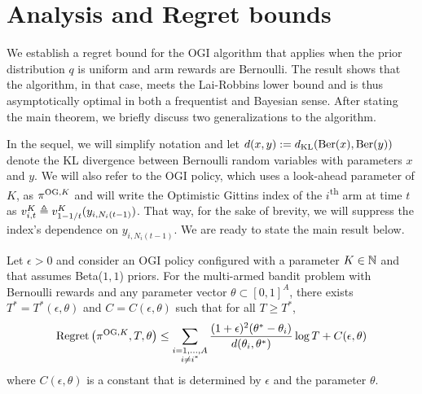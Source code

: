 \section{Analysis and Regret bounds} \label{sec:analysis_of_regret}
We establish a regret bound for the OGI algorithm that applies when the prior distribution $q$ is uniform and arm rewards are Bernoulli. The result shows that the algorithm, in that case, meets the Lai-Robbins lower bound and is thus asymptotically optimal in both a frequentist and Bayesian sense. After stating the main theorem, we briefly discuss two generalizations to the algorithm.

In the sequel, we will simplify notation  and let $d(x,y) := d_{\rm KL}(\text{Ber}(x),\text{Ber}(y))$ denote the KL divergence between Bernoulli random variables with parameters $x$ and $y$. We will also refer to the OGI policy, which uses a look-ahead parameter of $K$, as $\pi^{{\rm OG},K}$ and will write the Optimistic Gittins index of the $i$\textsuperscript{th} arm at time $t$ as $v^K_{i,t} \triangleq v^K_{1-1/t}(y_{i,N_i(t-1)})$. That way, for the sake of brevity, we will suppress the index's dependence on $y_{i,N_i(t-1)}$. We are ready to state the main result below.
\begin{theorem} \label{thm:frequentist_optimal_bound}
	Let $\epsilon > 0$ and consider an OGI policy configured with a parameter $K \in \mathbb{N}$ and that assumes Beta($1,1$) priors. For the multi-armed bandit problem with Bernoulli rewards and any parameter vector $\theta \subset [0,1]^A$, there exists $T^* = T^*(\epsilon, \theta)$ and $C = C(\epsilon,\theta)$ such that for all $T \ge T^*$,
	\begin{equation}
	\textnormal{Regret} \left( \pi^{{\rm OG},K}, T, \theta \right) \le \sum_{\substack{i=1,\ldots,A \\ i \ne i^*}} \frac{(1+\epsilon)^2(\theta^* - \theta_i)}{d(\theta_i, \theta^*)} \log T  + C(\epsilon,\theta)
	\end{equation}
	where $C(\epsilon,\theta)$ is a constant that is determined by $\epsilon$ and the parameter $\theta$.
\end{theorem}
